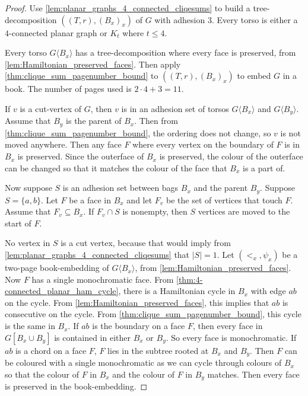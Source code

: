 \begin{proof}
	Use \cref{lem:planar_graphs_4_connected_cliqesums} to build a tree-decomposition $((T,r), (B_x)_x)$ of $G$ with adhesion $3$. Every torso is either a $4$-connected planar graph or $K_t$ where $t \leq 4$.
	
	Every torso $G \langle B_x \rangle$ has a tree-decomposition where every face is preserved, from \cref{lem:Hamiltonian_preserved_faces}. Then apply \cref{thm:clique_sum_pagenumber_bound} to $((T,r), (B_x)_x)$ to embed $G$ in a book. The number of pages used is $2 \cdot 4 + 3 = 11$. 

	If $v$ is a cut-vertex of $G$, then $v$ is in an adhesion set of torsos $G \langle B_x \rangle$ and $G \langle B_y \rangle$. Assume that $B_y$ is the parent of $B_x$. Then from \cref{thm:clique_sum_pagenumber_bound}, the ordering does not change, so $v$ is not moved anywhere. Then any face $F$ where every vertex on the boundary of $F$ is in $B_x$ is preserved. Since the outerface of $B_x$ is preserved, the colour of the outerface can be changed so that it matches the colour of the face that $B_x$ is a part of. 

	Now suppose $S$ is an adhesion set between bags $B_x$ and the parent $B_y$. Suppose $ S = \{a,b\}$. Let $F$ be a face in $B_x$ and let $F_v$ be the set of vertices that touch $F$. Assume that $F_v \subseteq B_x$. If $F_v \cap S$ is nonempty, then $S$ vertices are moved to the start of $F$. 
	
	No vertex in $S$ is a cut vertex, because that would imply from \cref{lem:planar_graphs_4_connected_cliqesums} that $|S| = 1$. Let $(<_x, \psi_x)$ be a two-page book-embedding of $G \langle B_x \rangle$, from \cref{lem:Hamiltonian_preserved_faces}. Now $F$ has a single monochromatic face.
	From \cref{thm:4-connected_planar_ham_cycle}, there is a Hamiltonian cycle in $B_x$ with edge $ab$ on the cycle. From \cref{lem:Hamiltonian_preserved_faces}, this implies that $ab$ is consecutive on the cycle. From \cref{thm:clique_sum_pagenumber_bound}, this cycle is the same in $B_x$. If $ab$ is the boundary on a face $F$, then every face in $G[B_x \cup B_y]$ is contained in either $B_x$ or $B_y$. So every face is monochromatic. If $ab$ is a chord on a face $F$, $F$ lies in the subtree rooted at $B_x$ and $B_y$. Then $F$ can be coloured with a single monochromatic as we can cycle through colours of $B_x$ so that the colour of $F$ in $B_x$ and the colour of $F$ in $B_y$ matches. Then every face is preserved in the book-embedding. 


\end{proof}
